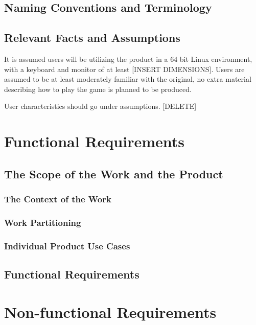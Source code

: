 \documentclass[12pt, titlepage]{article}
\begin{document}
\subsection{Naming Conventions and Terminology}

\subsection{Relevant Facts and Assumptions}

It is assumed users will be utilizing the product in a 64 bit Linux environment, with a keyboard and monitor of at least [INSERT DIMENSIONS]. Users are assumed to be at least moderately familiar with the original, no extra material describing how to play the game is planned to be produced.

User characteristics should go under assumptions. [DELETE]

\section{Functional Requirements}

\subsection{The Scope of the Work and the Product}

\subsubsection{The Context of the Work}

\subsubsection{Work Partitioning}

\subsubsection{Individual Product Use Cases}

\subsection{Functional Requirements}

\section{Non-functional Requirements}
\end{document}
